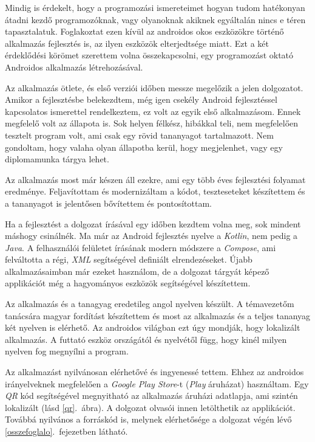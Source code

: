 \documentclass[12pt,a4paper]{article}
\newcommand{\xml}{\textit{XML}\xspace}
\begin{document}
	Mindig is érdekelt, hogy a programozási ismereteimet hogyan tudom hatékonyan átadni kezdő programozóknak, vagy olyanoknak akiknek egyáltalán nincs e téren tapasztalatuk. Foglakoztat ezen kívül az androidos okos eszközökre történő alkalmazás fejlesztés is, az ilyen eszközök elterjedtsége miatt. Ezt a két érdeklődési körömet szerettem volna összekapcsolni, egy programozást oktató Androidos alkalmazás létrehozásával.
	
	Az alkalmazás ötlete, és első verziói időben messze megelőzik a jelen dolgozatot. Amikor a fejlesztésbe belekezdtem, még igen csekély Android fejlesztéssel kapcsolatos ismerettel rendelkeztem, ez volt az egyik első alkalmazásom. Ennek megfelelő volt az állapota is. Sok helyen félkész, hibákkal teli, nem megfelelően tesztelt program volt, ami csak egy rövid tananyagot tartalmazott. Nem gondoltam, hogy valaha olyan állapotba kerül, hogy megjelenhet, vagy egy diplomamunka tárgya lehet.
	
	Az alkalmazás most már készen áll ezekre, ami egy több éves fejlesztési folyamat eredménye. Feljavítottam és modernizáltam a kódot, teszteseteket készítettem és a tananyagot is jelentősen bővítettem és pontosítottam.
	
	Ha a fejlesztést a dolgozat írásával egy időben kezdtem volna meg, sok mindent máshogy csinálnék. Ma már az Android fejlesztés nyelve a \textit{Kotlin}, nem pedig a \textit{Java}. A felhasználói felületet írásának modern módszere a \textit{Compose}, ami felváltotta a régi, \xml segítségével definiált elrendezéseket. 
	Újabb alkalmazásaimban már ezeket használom, de a dolgozat tárgyát képező applikációt még a hagyományos eszközök segítségével készítettem.
	
	Az alkalmazás és a tanagyag eredetileg angol nyelven készült. A témavezetőm tanácsára magyar fordítást készítettem és most az alkalmazás és a teljes tananyag két nyelven is elérhető. Az androidos világban ezt úgy mondják, hogy lokalizált alkalmazás. A futtató eszköz országától és nyelvétől függ, hogy kinél milyen 
	nyelven fog megnyílni a program.
	
	Az alkalmazást nyilvánosan elérhetővé és ingyenessé tettem. Ehhez az androidos irányelveknek megfelelően a \textit{Google Play Store}-t (\textit{Play} áruházat) használtam. Egy \textit{QR} kód segítségével megnyitható az alkalmazás áruházi adatlapja, ami szintén lokalizált (lásd \ref{qr}.\ ábra). A dolgozat olvasói innen letölthetik az applikációt. Továbbá nyilvános a forráskód is, melynek elérhetősége a dolgozat végén lévő \ref{osszefoglalo}.\ fejezetben látható.
	
\end{document}
